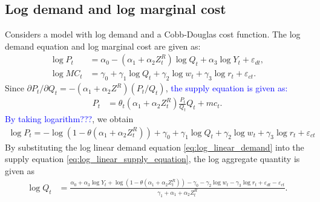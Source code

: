 \documentclass[11pt, a4paper]{article}
\begin{document}
\subsection{Log demand and log marginal cost}

Considers a model with log demand and a Cobb-Douglas cost function. 
The log demand equation and log marginal cost are given as:
\begin{align}
    \log P_{t} &= \alpha_0 - (\alpha_1 + \alpha_2 Z^R_t) \log Q_t + \alpha_3 \log Y_t + \varepsilon_{dt},\label{eq:log_linear_demand}\\
    \log MC_t &= \gamma_0 + \gamma_1 \log Q_t +  \gamma_2 \log w_t + \gamma_3 \log r_t + \varepsilon_{ct}.\label{eq:log_linear_marginal_cost}
\end{align}
Since $\partial P_t/\partial Q_t = - (\alpha_1 + \alpha_2 Z^R) (P_t/Q_t) $, \textcolor{blue}{the supply equation is given as:}
\begin{align}
    P_t &= \theta_t (\alpha_1 + \alpha_2 Z^R_t) \frac{P_t}{Q_t} Q_t + mc_t.\label{eq:supply_equation_loglinear}
\end{align}
\textcolor{blue}{By taking logarithm???}, we obtain
\begin{align}
    \log P_t = - \log(1 - \theta(\alpha_1 + \alpha_2 Z^R_t)) + \gamma_0 + \gamma_1 \log Q_t +  \gamma_2 \log w_t + \gamma_3 \log r_t + \varepsilon_{ct} \label{eq:log_linear_supply_equation}
\end{align}
By substituting the log linear demand equation \eqref{eq:log_linear_demand} into the supply equation \eqref{eq:log_linear_supply_equation}, the log aggregate quantity is given as 
\begin{align}
    \log Q_t &= \frac{ \alpha_0 + \alpha_3 \log Y_t + \log (1 - \theta (\alpha_1 + \alpha_2 Z^R_t)) - \gamma_0  -  \gamma_2 \log w_t - \gamma_3 \log r_t + \varepsilon_{dt} - \varepsilon_{ct}}{\gamma_1+ \alpha_1 + \alpha_2 Z^R_t }.
\end{align}


\end{document}

